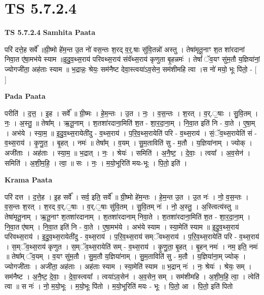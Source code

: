 \documentclass[17pt]{extarticle}
\begin{document}
\section{ TS 5.7.2.4 }

\textbf{TS 5.7.2.4 } \newline
\textbf{Samhita Paata} \newline

परि॑ दत्ते॒ह सर्वे᳚ ॥ग्री॒ष्मो हे॑म॒न्त उ॒त नो॑ वस॒न्तः श॒रद् व॒र्॒.षाः सु॑वि॒तन्नो॑ अस्तु । तेषा॑मृतू॒नाꣳ श॒त शा॑रदानां निवा॒त ए॑षा॒मभ॑ये स्याम ॥इ॒दु॒व॒थ्स॒राय॑ परिवथ्स॒राय॑ संवॅथ्स॒राय॑ कृणुता बृ॒हन्नमः॑ । तेषां᳚ ॅव॒यꣳ सु॑म॒तौ य॒ज्ञिया॑नां॒ ज्योगजी॑ता॒ अह॑ताः स्याम ॥ भ॒द्रान्नः॒ श्रेयः॒ सम॑नैष्ट देवा॒स्त्वया॑ऽव॒सेन॒ सम॑शीमहि त्वा ।स नो॑ मयो॒ भूः पि॑तो॒ - [  ] \newline

\textbf{Pada Paata} \newline

परीति॑ । द॒त्त॒ । इ॒ह । सर्वे᳚ ॥ ग्री॒ष्मः । हे॒म॒न्तः । उ॒त । नः॒ । व॒स॒न्तः । श॒रत् । व॒र्.॒षाः । सु॒वि॒तम् । नः॒ । अ॒स्तु॒ ॥ तेषा᳚म् । ऋ॒तू॒नाम् । श॒तशा॑रदाना॒मिति॑ श॒त - शा॒र॒दा॒ना॒म् । नि॒वा॒त इति॑ नि - वा॒ते । ए॒षा॒म् । अभ॑ये । स्या॒म॒ ॥ इ॒दु॒व॒थ्स॒रायेती॑दु - व॒थ्स॒राय॑ । प॒रि॒व॒थ्स॒रायेति॑ परि - व॒थ्स॒राय॑ । सं॒ॅव॒थ्स॒रायेति॑ सं - व॒थ्स॒राय॑ । कृ॒णु॒त॒ । बृ॒हत् । नमः॑ ॥ तेषा᳚म् । व॒यम् । सु॒म॒ताविति॑ सु - म॒तौ । य॒ज्ञिया॑नाम् । ज्योक् । अजी॑ताः । अह॑ताः । स्या॒म॒ ॥ भ॒द्रात् । नः॒ । श्रेयः॑ । समिति॑ । अ॒नै॒ष्ट॒ । दे॒वाः॒ । त्वया᳚ । अ॒व॒सेन॑ । समिति॑ । अ॒शी॒म॒हि॒ । त्वा॒ ॥ सः । नः॒ । म॒यो॒भूरिति॑ मयः-भूः । पि॒तो॒ इति॑ ।  \newline


\textbf{Krama Paata} \newline

परि॑ दत्त । द॒त्ते॒ह । इ॒ह सर्वे᳚ । सर्व॒ इति॒ सर्वे᳚ ॥ ग्री॒ष्मो हे॑म॒न्तः । हे॒म॒न्त उ॒त । उ॒त नः॑ । नो॒ व॒स॒न्तः । व॒स॒न्तः श॒रत् । श॒रद् व॒र्.॒षाः । व॒र्.॒षाः सु॑वि॒तम् । सु॒वि॒तम् नः॑ । नो॒ अ॒स्तु॒ । अ॒स्त्वित्य॑स्तु ॥ तेषा॑मृतू॒नाम् । ऋ॒तू॒नाꣳ श॒तशा॑रदानाम् । श॒तशा॑रदानाम् निवा॒ते । श॒तशा॑रदाना॒मिति॑ श॒त - शा॒र॒दा॒ना॒म् । नि॒वा॒त ए॑षाम् । नि॒वा॒त इति॑ नि - वा॒ते । ए॒षा॒मभ॑ये । अभ॑ये स्याम । स्या॒मेति॑ स्याम ॥ इ॒दु॒व॒थ्स॒राय॑ परिवथ्स॒राय॑ । इ॒दु॒व॒थ्स॒रायेती॑दु - व॒थ्स॒राय॑ । प॒रि॒व॒थ्स॒राय॑ सम्ॅवथ्स॒राय॑ । प॒रि॒व॒थ्स॒रायेति॑ परि - व॒थ्स॒राय॑ । स॒म्ॅव॒थ्स॒राय॑ कृणुत । स॒म्ॅव॒थ्स॒रायेति॑ सम् - व॒थ्स॒राय॑ । कृ॒णु॒ता॒ बृ॒हत् । बृ॒हन् नमः॑ । नम॒ इति॒ नमः॑ ॥ तेषा᳚म् ॅव॒यम् । व॒यꣳ सु॑म॒तौ । सु॒म॒तौ य॒ज्ञिया॑नाम् । सु॒म॒ताविति॑ सु - म॒तौ । य॒ज्ञिया॑ना॒म् ज्योक् । ज्योगजी॑ताः । अजी॑ता॒ अह॑ताः । अह॑ताः स्याम । स्या॒मेति॑ स्याम ॥ भ॒द्रान् नः॑ । नः॒ श्रेयः॑ । श्रेयः॒ सम् । सम॑नैष्ट । अ॒नै॒ष्ट॒ दे॒वाः॒ । दे॒वा॒स्त्वया᳚ । त्वया॑ऽव॒सेन॑ । अ॒व॒सेन॒ सम् । सम॑शीमहि । अ॒शी॒म॒हि॒ त्वा॒ । त्वेति॑ त्वा ॥ स नः॑ । नो॒ म॒यो॒भूः । म॒यो॒भूः पि॑तो । म॒यो॒भूरिति॑ मयः - भूः । पि॒तो॒ आ । पि॒तो॒ इति॑ पितो \newline
\end{document}
